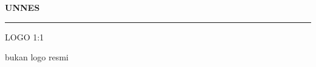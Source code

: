 \documentclass[10pt]{article}
\begin{document}
\begin{center}
\vspace*{0.22cm}
{\bfseries UNNES}\par
\vspace{0.08cm}
\rule{1.7cm}{0.4pt}\par
\vspace{0.08cm}
{\scriptsize LOGO 1:1}\par
{\scriptsize bukan logo resmi}
\end{center}
\end{document}
